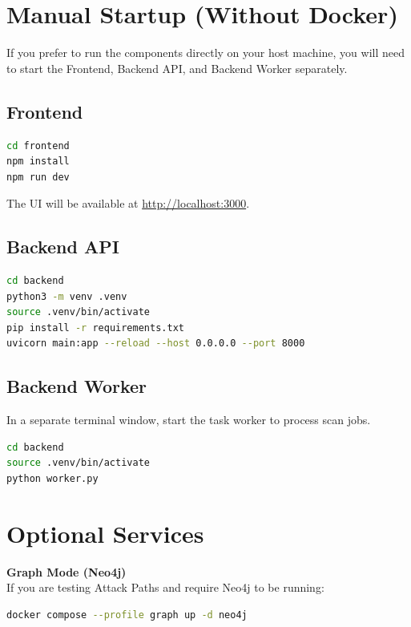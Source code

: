 \documentclass{article}
\begin{document}
\section{Manual Startup (Without Docker)}

If you prefer to run the components directly on your host machine, you will need to start the Frontend, Backend API, and Backend Worker separately.

\subsection{Frontend}
\begin{lstlisting}[language=bash, frame=single, backgroundcolor=\color{lightgray!20}]
cd frontend
npm install
npm run dev
\end{lstlisting}
The UI will be available at \url{http://localhost:3000}.

\subsection{Backend API}
\begin{lstlisting}[language=bash, frame=single, backgroundcolor=\color{lightgray!20}]
cd backend
python3 -m venv .venv
source .venv/bin/activate
pip install -r requirements.txt
uvicorn main:app --reload --host 0.0.0.0 --port 8000
\end{lstlisting}

\subsection{Backend Worker}
In a separate terminal window, start the task worker to process scan jobs.
\begin{lstlisting}[language=bash, frame=single, backgroundcolor=\color{lightgray!20}]
cd backend
source .venv/bin/activate
python worker.py
\end{lstlisting}

\section{Optional Services}

\textbf{Graph Mode (Neo4j)}\\
If you are testing Attack Paths and require Neo4j to be running:
\begin{lstlisting}[language=bash, frame=single, backgroundcolor=\color{lightgray!20}]
docker compose --profile graph up -d neo4j
\end{lstlisting}
\end{document}
